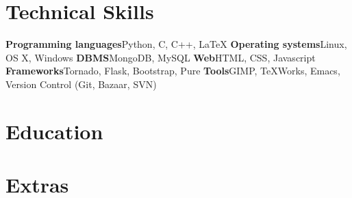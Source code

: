 \documentclass[11pt,a4paper,sans]{moderncv}        %
\begin{document}
\section{Technical Skills}
\cvcomputer
{\textbf{Programming languages}}{Python, C, C++, \LaTeX}
{\textbf{Operating systems}}{Linux, OS X, Windows}
\cvcomputer
{\textbf{DBMS}}{MongoDB, MySQL}
{\textbf{Web}}{HTML, CSS, Javascript}
\cvcomputer
{\textbf{Frameworks}}{Tornado, Flask, Bootstrap, Pure}
{\textbf{Tools}}{GIMP, TeXWorks, Emacs, Version Control (Git, Bazaar, SVN)}
{}

\section{Education}


\section{Extras}
\clearpage
\end{document}
